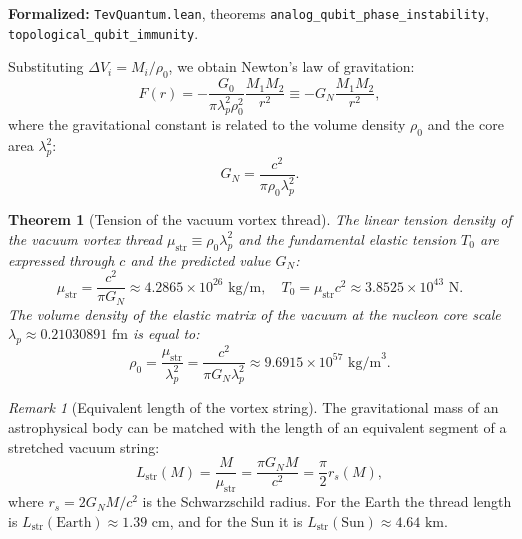 \documentclass[11pt,a4paper]{article}
\newtheorem{theorem}{Theorem}
\theoremstyle{definition}
\theoremstyle{remark}
\newtheorem{remark}{Remark}
\begin{document}
\noindent\small\textbf{Formalized:} \texttt{TevQuantum.lean}, theorems \texttt{analog_qubit_phase_instability}, \texttt{topological_qubit_immunity}.

Substituting $\Delta V_i = M_i / \rho_0$, we obtain Newton's law of gravitation:
\begin{equation}
	F(r) = -\frac{G_0}{\pi \lambda_p^2 \rho_0^2} \frac{M_1 M_2}{r^2} \equiv -G_N \frac{M_1 M_2}{r^2},
\label{eq:newton_law_exact}
\end{equation}
where the gravitational constant is related to the volume density $\rho_0$ and the core area $\lambda_p^2$:
\begin{equation}
	G_N = \frac{c^2}{\pi \rho_0 \lambda_p^2}.
\label{eq:GN_density_exact_rel}
\end{equation}

\begin{theorem}[Tension of the vacuum vortex thread]
\label{thm:planck_string_tension}
The linear tension density of the vacuum vortex thread $\mu_{\mathrm{str}} \equiv \rho_0 \lambda_p^2$ and the fundamental elastic tension $T_0$ are expressed through $c$ and the predicted value $G_N$:
\begin{equation}
	\mu_{\mathrm{str}} = \frac{c^2}{\pi G_N} \approx 4.2865 \times 10^{26}\text{ kg/m}, \quad T_0 = \mu_{\mathrm{str}} c^2 \approx 3.8525 \times 10^{43}\text{ N}.
\label{eq:mu_str_and_T0_vals}
\end{equation}
The volume density of the elastic matrix of the vacuum at the nucleon core scale $\lambda_p \approx 0.21030891\text{ fm}$ is equal to:
\begin{equation}
	\rho_0 = \frac{\mu_{\mathrm{str}}}{\lambda_p^2} = \frac{c^2}{\pi G_N \lambda_p^2} \approx 9.6915 \times 10^{57}\text{ kg/m}^3.
\label{eq:rho_0_exact_num}
\end{equation}
\end{theorem}

\begin{remark}[Equivalent length of the vortex string]
The gravitational mass of an astrophysical body can be matched with the length of an equivalent segment of a stretched vacuum string:
\begin{equation}
	L_{\mathrm{str}}(M) = \frac{M}{\mu_{\mathrm{str}}} = \frac{\pi G_N M}{c^2} = \frac{\pi}{2} r_s(M),
	\label{eq:string_equivalent_length}
\end{equation}
where $r_s = 2 G_N M / c^2$ is the Schwarzschild radius. For the Earth the thread length is $L_{\mathrm{str}}(\text{Earth}) \approx 1.39\text{ cm}$, and for the Sun it is $L_{\mathrm{str}}(\text{Sun}) \approx 4.64\text{ km}$.
\end{remark}
\end{document}
